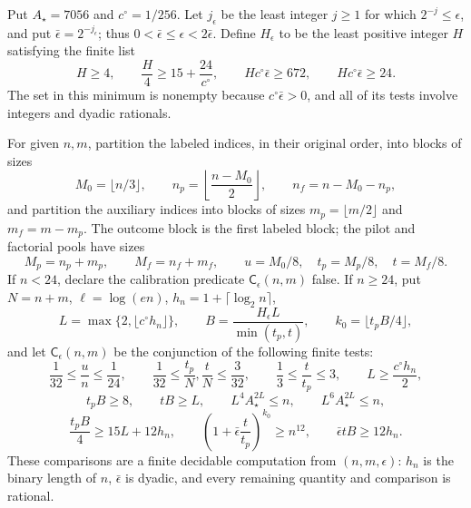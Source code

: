 Put \(A_\star=7056\) and \(c^\circ=1/256\).  Let \(j_\epsilon\) be the least integer \(j\ge1\) for which \(2^{-j}\le\epsilon\), and put \(\bar\epsilon=2^{-j_\epsilon}\); thus \(0<\bar\epsilon\le\epsilon<2\bar\epsilon\).  Define \(H_\epsilon\) to be the least positive integer \(H\) satisfying the finite list
\[
 H\ge4,\qquad \frac H4\ge15+\frac{24}{c^\circ},\qquad
 Hc^\circ\bar\epsilon\ge672,
 \qquad Hc^\circ\bar\epsilon\ge24.                                      \tag{C1}
\]
The set in this minimum is nonempty because \(c^\circ\bar\epsilon>0\), and all of its tests involve integers and dyadic rationals.

For given \(n,m\), partition the labeled indices, in their original order, into blocks of sizes
\[
 M_0=\lfloor n/3\rfloor,\qquad
 n_p=\left\lfloor\frac{n-M_0}{2}\right\rfloor,
 \qquad n_f=n-M_0-n_p,
\]
and partition the auxiliary indices into blocks of sizes
\(m_p=\lfloor m/2\rfloor\) and \(m_f=m-m_p\).  The outcome block is the first labeled block; the pilot and factorial pools have sizes
\[
 M_p=n_p+m_p,\qquad M_f=n_f+m_f,\qquad
 u=M_0/8,\quad t_p=M_p/8,\quad t=M_f/8.                            \tag{C2}
\]
If \(n<24\), declare the calibration predicate \(\mathsf C_\epsilon(n,m)\) false.  If \(n\ge24\), put \(N=n+m\), \(\ell=\log(en)\), \(h_n=1+\lceil\log_2 n\rceil\),
\[
 L=\max\{2,\lfloor c^\circ h_n\rfloor\},\qquad
 B=\frac{H_\epsilon L}{\min(t_p,t)},\qquad
 k_0=\lfloor t_pB/4\rfloor,                                          \tag{C3}
\]
and let \(\mathsf C_\epsilon(n,m)\) be the conjunction of the following finite tests:
\[
 \frac1{32}\le\frac un\le\frac1{24},\qquad
 \frac1{32}\le\frac{t_p}{N},\frac tN\le\frac3{32},\qquad
 \frac13\le\frac t{t_p}\le3,\qquad L\ge\frac{c^\circ h_n}{2},   \tag{C4}
\]
\[
 t_pB\ge8,\qquad tB\ge L,\qquad
 L^4A_\star^{2L}\le n,\qquad L^6A_\star^{2L}\le n,               \tag{C5}
\]
\[
 \frac{t_pB}{4}\ge15L+12h_n,\qquad
 \left(1+\bar\epsilon\frac t{t_p}\right)^{k_0}\ge n^{12},
 \qquad \bar\epsilon tB\ge12h_n.                                  \tag{C6}
\]
These comparisons are a finite decidable computation from \((n,m,\epsilon)\): \(h_n\) is the binary length of \(n\), \(\bar\epsilon\) is dyadic, and every remaining quantity and comparison is rational.

